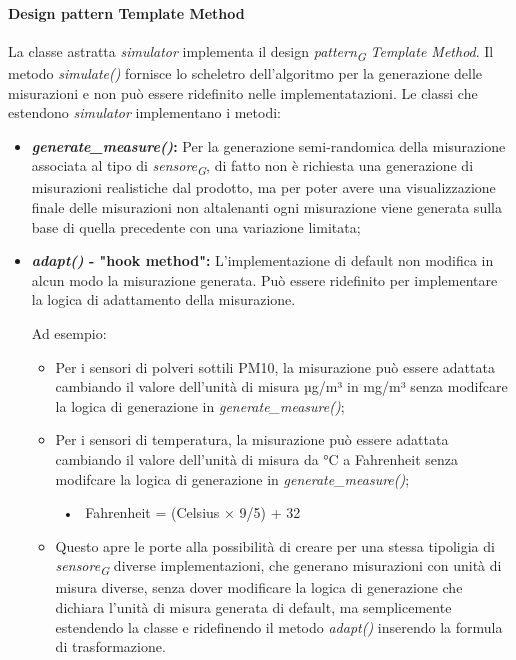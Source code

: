 \paragraph{Design pattern Template Method} \label{sec:templateSIM}

La classe astratta \textit{simulator} implementa il design \textit{pattern}\textsubscript{\textit{G}} \textit{Template Method}. Il metodo \textit{simulate()} fornisce lo scheletro dell'algoritmo per la generazione delle misurazioni e non può essere ridefinito nelle implementatazioni. Le classi che estendono \textit{simulator} implementano i metodi:
\begin{itemize}
    \item \textbf{\textit{generate\_measure()}:} Per la generazione semi-randomica della misurazione associata al tipo di \textit{sensore}\textsubscript{\textit{G}}, di fatto non è richiesta una generazione di misurazioni realistiche dal prodotto, ma per poter avere una visualizzazione finale delle misurazioni non altalenanti ogni misurazione viene generata sulla base di quella precedente con una variazione limitata;
    
    \item \textbf{\textit{adapt()} - "hook method":} L'implementazione di default non modifica in alcun modo la misurazione generata. Può essere ridefinito per implementare la logica di adattamento della misurazione.
    
    Ad esempio:
    \begin{itemize}
        \item Per i sensori di polveri sottili PM10, la misurazione può essere adattata cambiando il valore dell'unità di misura µg/m³ in mg/m³ senza modifcare la logica di generazione in \textit{generate\_measure()};
        
        \item Per i sensori di temperatura, la misurazione può essere adattata cambiando il valore dell'unità di misura da °C a Fahrenheit  senza modifcare la logica di generazione in \textit{generate\_measure()};
        
        ~•~ Fahrenheit = (Celsius × 9/5) + 32
 
        \item Questo apre le porte alla possibilità di creare per una stessa tipoligia di \textit{sensore}\textsubscript{\textit{G}} diverse implementazioni, che generano misurazioni con unità di misura diverse, senza dover modificare la logica di generazione che dichiara l'unità di misura generata di default, ma semplicemente estendendo la classe e ridefinendo il metodo \textit{adapt()} inserendo la formula di trasformazione.
        

\end{itemize}
\end{itemize}

